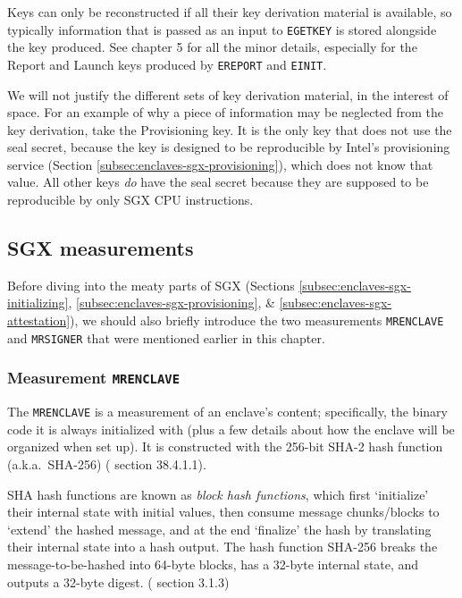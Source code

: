 Keys can only be reconstructed if all their key derivation material is available, so typically information that is passed as an input to {\tt EGETKEY} is stored alongside the key produced. See \cite{intel-sgx-explained-advanced} chapter 5 for all the minor details, especially for the Report and Launch keys produced by {\tt EREPORT} and {\tt EINIT}.

We will not justify the different sets of key derivation material, in the interest of space. For an example of why a piece of information may be neglected from the key derivation, take the Provisioning key. It is the only key that does not use the seal secret, because the key is designed to be reproducible by Intel's provisioning service (Section \ref{subsec:enclaves-sgx-provisioning}), which does not know that value. All other keys {\em do} have the seal secret because they are supposed to be reproducible by only SGX CPU instructions.


\subsection{SGX measurements}
\label{subsec:enclaves-sgx-measurements}

Before diving into the meaty parts of SGX (Sections \ref{subsec:enclaves-sgx-initializing}, \ref{subsec:enclaves-sgx-provisioning}, \& \ref{subsec:enclaves-sgx-attestation}), we should also briefly introduce the two measurements {\tt MRENCLAVE} and {\tt MRSIGNER} that were mentioned earlier in this chapter.

\subsubsection{Measurement {\tt MRENCLAVE}}

The {\tt MRENCLAVE} is a measurement of an enclave's content; specifically, the binary code it is always initialized with (plus a few details about how the enclave will be organized when set up). It is constructed with the 256-bit SHA-2 hash function (a.k.a.\ SHA-256) (\cite{sgx-manual} section 38.4.1.1).

SHA hash functions are known as {\em block hash functions}, which first `initialize' their internal state with initial values, then consume message chunks/blocks to `extend' the hashed message, and at the end `finalize' the hash by translating their internal state into a hash output. The hash function SHA-256 breaks the message-to-be-hashed into 64-byte blocks, has a 32-byte internal state, and outputs a 32-byte digest. (\cite{intel-sgx-explained-advanced} section 3.1.3)

